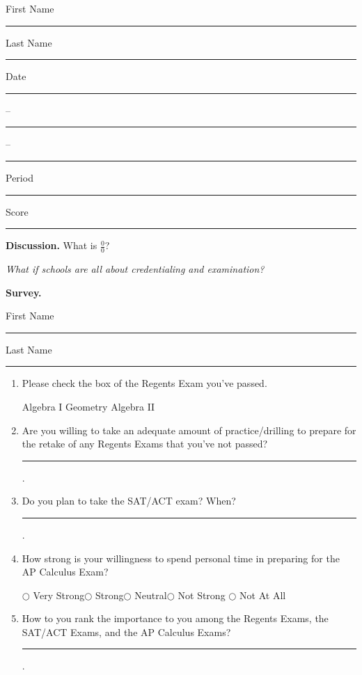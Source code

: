 \documentclass[twoside, 10pt]{article}
\title{}
\date{}
\begin{document}
\noindent
{\large
First Name \rule{6em}{.1pt}Last Name \rule{6em}{.1pt} Date \rule{1.5em}{.1pt} -- \rule{1.5em}{.1pt} -- \rule{1.5em}{.1pt} Period \rule{2em}{.1pt} Score \rule{2em}{.1pt}
}
\vspace{1em}

{\noindent\bf Discussion.} What is $\displaystyle \frac{0}{0}$?
\clearpage
\begin{center}
{\it What if schools are all about credentialing and examination?}
\end{center}
\vspace{5em}

{\noindent\bf Survey.}
\vspace{2em}

First Name \rule{10em}{.1pt}\hspace{2em}Last Name \rule{10em}{.1pt}
\begin{enumerate}
\item Please check the box of the Regents Exam you've passed.

\scalebox{1.5}{$\square$} Algebra I\scalebox{1.5}{$\square$} Geometry\scalebox{1.5}{$\square$} Algebra II

\item Are you willing to take an adequate amount of practice/drilling to prepare for the retake of any Regents Exams that you've not passed?
\vspace{2em}

\rule{5em}{.1pt}.
\item Do you plan to take the SAT/ACT exam? When?
\vspace{2em}

\rule{.9\textwidth}{.1pt}.
\item How strong is your willingness to spend personal time in preparing for the AP Calculus Exam?

$\bigcirc$ Very Strong$\bigcirc$ Strong$\bigcirc$ Neutral$\bigcirc$ Not Strong $\bigcirc$ Not At All
\item How to you rank the importance to you among the Regents Exams, the SAT/ACT Exams, and the AP 
Calculus Exams?
\vspace{2em}

\rule{.9\textwidth}{.1pt}.
\end{enumerate}
\end{document}
